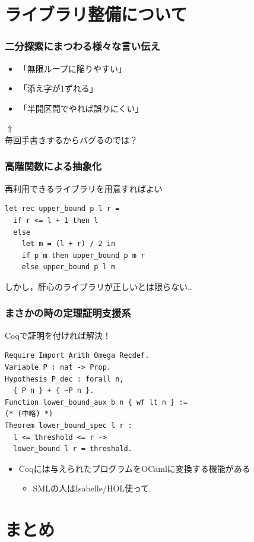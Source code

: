 \documentclass[dvipdfmx,cjk,xcolor=dvipsnames,envcountsect,notheorems,12pt]{beamer}
\theoremstyle{definition}
\begin{document}
\section{ライブラリ整備について}

\begin{frame}
	\frametitle{二分探索にまつわる様々な言い伝え}
	\begin{itemize}
		\item 「無限ループに陥りやすい」
		\item 「添え字が1ずれる」
		\item 「半開区間でやれば誤りにくい」
	\end{itemize}
	\begin{center}
		\LARGE $\Uparrow$\\
		毎回手書きするからバグるのでは？
	\end{center}
\end{frame}

\begin{frame}[fragile]
	\frametitle{高階関数による抽象化}
	\Large
	再利用できるライブラリを用意すればよい
	\begin{lstlisting}
let rec upper_bound p l r =
  if r <= l + 1 then l
  else
    let m = (l + r) / 2 in
    if p m then upper_bound p m r
    else upper_bound p l m
\end{lstlisting}
	\vfill
	しかし，肝心のライブラリが正しいとは限らない…
\end{frame}

\begin{frame}[fragile]
	\frametitle{まさかの時の定理証明支援系}
	\Large Coqで証明を付ければ解決！
	\begin{lstlisting}
Require Import Arith Omega Recdef.
Variable P : nat -> Prop.
Hypothesis P_dec : forall n,
  { P n } + { ~P n }.
Function lower_bound_aux b n { wf lt n } :=
(* (中略) *)
Theorem lower_bound_spec l r :
  l <= threshold <= r ->
  lower_bound l r = threshold.
\end{lstlisting}
	\begin{itemize}
		\item Coqには与えられたプログラムをOCamlに変換する機能がある
			\begin{itemize}
				\item SMLの人はIsabelle/HOL使って
			\end{itemize}
	\end{itemize}
\end{frame}

\section{まとめ}
\end{document}
